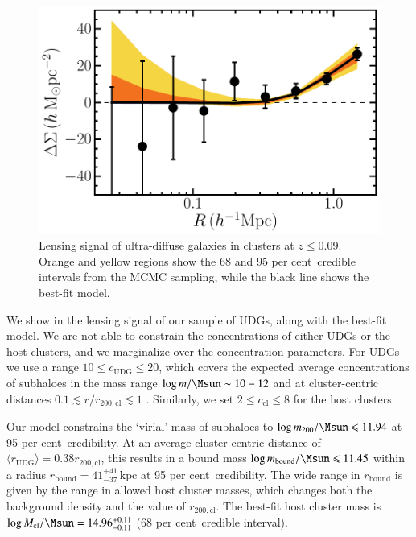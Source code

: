 \documentclass[usenatbib,fleqn]{mnras}
\def\udg{\mathrm{UDG}}
\def\bound{\mathrm{bound}}
\def\Mcl{M_\mathrm{cl}}df
\def\percent{ per cent}
\begin{document}
\begin{figure}
 \centerline{\includegraphics[width=0.95\linewidth]{esd.pdf}}
\caption{Lensing signal of ultra-diffuse galaxies in clusters at $z\leq0.09$. Orange and yellow regions show the 68 and 95\percent\ credible intervals from the MCMC sampling, while the black line shows the best-fit model.}
\label{f:esd}
\end{figure}


We show in  the lensing signal of our sample of UDGs, along with the best-fit model. We are not able to constrain the concentrations of either UDGs or the host clusters, and we marginalize over the concentration parameters. For UDGs we use a range $10 \leq c_\udg \leq 20$, which covers the expected average concentrations of subhaloes in the mass range $\log m/\Msun \sim 10-12$ and at cluster-centric distances $0.1\lesssim r/r_\mathrm{200,cl} \lesssim 1$ \citep{moline16}. Similarly, we set $2 \leq c_\mathrm{cl} \leq 8$ for the host clusters \citep[e.g.,][]{dutton14}.

Our model constrains the `virial' mass of subhaloes to $\log m_{200}/\Msun\leq11.94$ at 95\percent\ credibility. At an average cluster-centric distance of $\langle r_\udg \rangle=0.38r_\mathrm{200,cl}$, this results in a bound mass $\log m_\bound/\Msun\leq 11.45$ within a radius $r_\bound=41_{-37}^{+41}\,\mathrm{kpc}$ at 95\percent\ credibility. The wide range in $r_\bound$ is given by the range in allowed host cluster masses, which changes both the background density and the value of $r_\mathrm{200,cl}$. The best-fit host cluster mass is $\log\Mcl/\Msun=14.96_{-0.11}^{+0.11}$ (68\percent\ credible interval).
\end{document}
